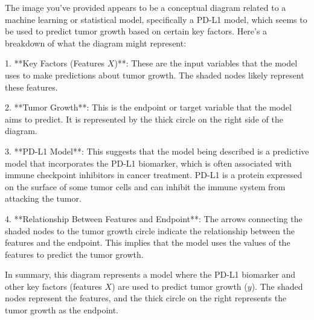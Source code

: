 The image you've provided appears to be a conceptual diagram related to a machine learning or statistical model, specifically a PD-L1 model, which seems to be used to predict tumor growth based on certain key factors. Here's a breakdown of what the diagram might represent:

1. **Key Factors (Features \( X \))**: These are the input variables that the model uses to make predictions about tumor growth. The shaded nodes likely represent these features.

2. **Tumor Growth**: This is the endpoint or target variable that the model aims to predict. It is represented by the thick circle on the right side of the diagram.

3. **PD-L1 Model**: This suggests that the model being described is a predictive model that incorporates the PD-L1 biomarker, which is often associated with immune checkpoint inhibitors in cancer treatment. PD-L1 is a protein expressed on the surface of some tumor cells and can inhibit the immune system from attacking the tumor.

4. **Relationship Between Features and Endpoint**: The arrows connecting the shaded nodes to the tumor growth circle indicate the relationship between the features and the endpoint. This implies that the model uses the values of the features to predict the tumor growth.

In summary, this diagram represents a model where the PD-L1 biomarker and other key factors (features \( X \)) are used to predict tumor growth (\( y \)). The shaded nodes represent the features, and the thick circle on the right represents the tumor growth as the endpoint.